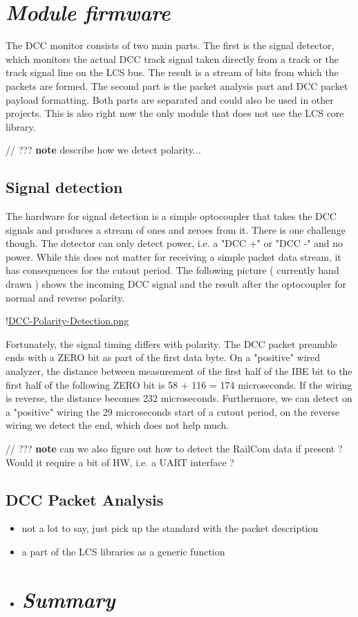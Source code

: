\section{\textit{Module firmware}}

The DCC monitor consists of two main parts. The first is the signal detector, which monitors the actual DCC track signal taken directly from a track or the track signal line on the LCS bus. The result is a stream of bits from which the packets are formed. The second part is the packet analysis part and DCC packet payload formatting. Both parts are separated and could also be used in other projects. This is also right now the only module that does not use the LCS core library.

// ??? \textbf{note} describe how we detect polarity...

\subsection{Signal detection}

The hardware for signal detection is a simple optocoupler that takes the DCC signals and produces a stream of ones and zeroes from it. There is one challenge though. The detector can only detect power, i.e. a "DCC +" or "DCC -" and no power. While this does not matter for receiving a simple packet data stream, it has consequences for the cutout period. The following picture ( currently hand drawn ) shows the incoming DCC signal and the result after the optocoupler for normal and reverse polarity.

!\href{./Figures/DCC-Polarity-Detection.png }{DCC-Polarity-Detection.png}

Fortunately, the signal timing differs with polarity. The DCC packet preamble ends with a ZERO bit as part of the first data byte. On a "positive" wired analyzer, the distance between measurement of the first half of the IBE bit to the first half of the following ZERO bit is 58 + 116 = 174 microseconds. If the wiring is reverse, the distance becomes 232 microseconds. Furthermore, we can detect on a "positive" wiring the 29 microseconds start of a cutout period, on the reverse wiring we detect the end, which does not help much.

// ??? \textbf{note} can we also figure out how to detect the RailCom data if present ? Would it require a bit of HW, i.e. a UART interface ?

\subsection{DCC Packet Analysis}
\begin{itemize}
\item not a lot to say, just pick up the standard with the packet description
\item a part of the LCS libraries as a generic function
\item \section{\textit{Summary}}
\end{itemize}
